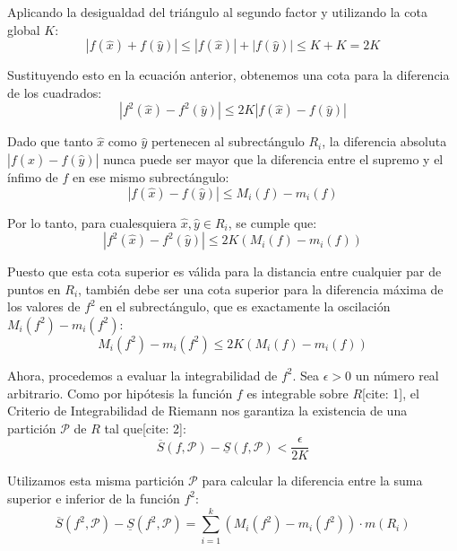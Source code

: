 \documentclass[11pt,letterpaper]{article}
\begin{document}
Aplicando la desigualdad del triángulo al segundo factor y utilizando la cota global $K$:
\begin{equation*}
|f(\hat{x}) + f(\hat{y})| \le |f(\hat{x})| + |f(\hat{y})| \le K + K = 2K
\end{equation*}

Sustituyendo esto en la ecuación anterior, obtenemos una cota para la diferencia de los cuadrados:
\begin{equation*}
|f^{2}(\hat{x}) - f^{2}(\hat{y})| \le 2K |f(\hat{x}) - f(\hat{y})|
\end{equation*}

Dado que tanto $\hat{x}$ como $\hat{y}$ pertenecen al subrectángulo $R_{i}$, la diferencia absoluta $|f(\hat{x}) - f(\hat{y})|$ nunca puede ser mayor que la diferencia entre el supremo y el ínfimo de $f$ en ese mismo subrectángulo:
\begin{equation*}
|f(\hat{x}) - f(\hat{y})| \le M_{i}(f) - m_{i}(f)
\end{equation*}

Por lo tanto, para cualesquiera $\hat{x}, \hat{y} \in R_{i}$, se cumple que:
\begin{equation*}
|f^{2}(\hat{x}) - f^{2}(\hat{y})| \le 2K (M_{i}(f) - m_{i}(f))
\end{equation*}

Puesto que esta cota superior es válida para la distancia entre cualquier par de puntos en $R_{i}$, también debe ser una cota superior para la diferencia máxima de los valores de $f^{2}$ en el subrectángulo, que es exactamente la oscilación $M_{i}(f^{2}) - m_{i}(f^{2})$:
\begin{equation*}
M_{i}(f^{2}) - m_{i}(f^{2}) \le 2K (M_{i}(f) - m_{i}(f))
\end{equation*}

Ahora, procedemos a evaluar la integrabilidad de $f^{2}$. Sea $\epsilon > 0$ un número real arbitrario. Como por hipótesis la función $f$ es integrable sobre $R$[cite: 1], el Criterio de Integrabilidad de Riemann nos garantiza la existencia de una partición $\mathcal{P}$ de $R$ tal que[cite: 2]:
\begin{equation*}
\overline{S}(f, \mathcal{P}) - \underline{S}(f, \mathcal{P}) < \frac{\epsilon}{2K}
\end{equation*}

Utilizamos esta misma partición $\mathcal{P}$ para calcular la diferencia entre la suma superior e inferior de la función $f^{2}$:
\begin{equation*}
\overline{S}(f^{2}, \mathcal{P}) - \underline{S}(f^{2}, \mathcal{P}) = \sum_{i=1}^{k} (M_{i}(f^{2}) - m_{i}(f^{2})) \cdot m(R_{i})
\end{equation*}
\end{document}
